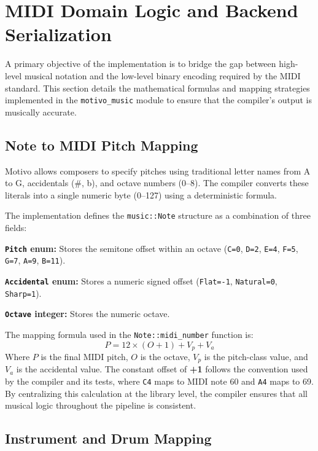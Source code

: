 \section{MIDI Domain Logic and Backend Serialization}\label{sec:midi-backend-design}

A primary objective of the implementation is to bridge the gap between high-level musical notation and the low-level
binary encoding required by the MIDI standard.
This section details the mathematical formulas and mapping strategies implemented in the
\texttt{motivo\_music} module to
ensure that the compiler's output is musically accurate.

\subsection{Note to MIDI Pitch Mapping}\label{detail-subsec:note-to-midi-pitch-mapping}

Motivo allows composers to specify pitches using traditional letter names from A to G, accidentals (\#, b), and
octave numbers
(0--8).
The compiler converts these literals into a single numeric byte (0--127) using a deterministic formula.

The implementation defines the \texttt{music::Note} structure as a combination of three fields:

\noindent \textbf{\texttt{Pitch} enum:} Stores the semitone offset within an octave (\texttt{C=0}, \texttt{D=2},
\texttt{E=4}, \texttt{F=5}, \texttt{G=7}, \texttt{A=9}, \texttt{B=11}).

\noindent \textbf{\texttt{Accidental} enum:} Stores a numeric signed offset (\texttt{Flat=-1}, \texttt{Natural=0},
\texttt{Sharp=1}).

\noindent \textbf{\texttt{Octave} integer:} Stores the numeric octave.

The mapping formula used in the \texttt{Note::midi\_number} function is:
\begin{equation}
  P = 12 \times (O + 1) + V_p + V_a\label{eq:midi-pitch-detail}
\end{equation}
Where $P$ is the final MIDI pitch, $O$ is the octave, $V_p$ is the pitch-class value, and $V_a$ is the accidental value.
The constant offset of \textbf{+1} follows the convention used by the compiler and its tests, where \texttt{C4} maps to
MIDI note 60 and \texttt{A4} maps to 69.
By centralizing this calculation at the library level, the compiler ensures that all musical logic throughout the
pipeline is consistent.

\subsection{Instrument and Drum Mapping}\label{detail-subsec:instrument-and-drum-mapping}

